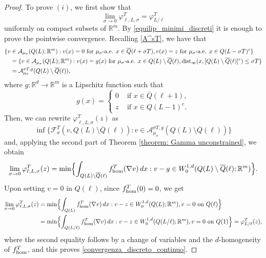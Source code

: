 \documentclass{article}
\theoremstyle{plain}
\theoremstyle{definition}
\def\rr{{\mathbb R}}
\def\ms{\mu_\sigma}
\newcommand{\f}{\varphi}
\newcommand{\s}{\sigma}
\newcommand{\A}{\mathcal{A}}
\newcommand{\F}{\mathcal{F}}
\newcommand{\Q}
{\overline{Q}}
\numberwithin{equation}{section}
\begin{document}
\begin{proof}
To prove $(i)$, we first show that
\begin{equation}
\label{convergenza_discreto_continuo}
    \lim_{\s\to0}\f^T_{\ell,L,\s} =\f^T_{L/\ell}
\end{equation}
uniformly on compact subsets of $\rr^m$.
By \eqref{equilip_minimi_discreti} it is enough to prove the pointwise convergence. Recalling \eqref{A^sT}, we have that
    \begin{equation*}
        \begin{split}
            \{ v&\in \A_{{\mu_\sigma}}(Q(L); \rr^m):  v(x)= 0 \text{ for } \ms\text{-a.e. } x\in\overline{Q}(\ell+\sigma T),
     v(x)= z \text{ for } \ms\text{-a.e. } x\in Q(L-\sigma T)^c \}\\
     &=\{ v\in \A_{\mu_\s}(Q(L); \rr^m) : v(x)=g(x) \text{ for } \ms\text{-a.e. } x\in Q(L)\setminus \Q(\ell), \text{\rm dist}_\infty(x,[Q(L)\setminus \Q(\ell)]^c)\leq \s T\} \\
     & = \A_{\ms}^{\s T,g}(Q(L)\setminus \Q(\ell)),
        \end{split}
    \end{equation*}
    where $g: \rr^d\to \rr^m$ is a Lipschitz function such that
    \begin{equation*}
 g(x)=
        \begin{cases}
            0 &\text{ if } x \in \overline{Q}(\ell+1), \\
            z &\text{ if } x\in Q(L-1)^c.
        \end{cases}
    \end{equation*}    
    Then, we can rewrite $\f^T_{\ell,L,\sigma}(z)$ as
\begin{equation*}
        \inf\{ \F^T_{\sigma}(v, Q(L)\setminus \overline{Q}(\ell)) : v\in \A_{\ms}^{\s T,g}(Q(L)\setminus \Q(\ell))\}
\end{equation*}
and, applying the second part of Theorem \ref{theorem: Gamma unconstrained}, we obtain
\begin{equation*}
    \lim_{\s\to0}\f^T_{\ell,L,\sigma}(z)  = \min\Bigl\{ \int_{Q(L)\setminus\Q(\ell)}f^T_{\rm hom}(\nabla v)\, dx : v-g\in W^{1,d}_0(Q(L)\setminus\Q(\ell);\mathbb{R}^m)\Bigr\}.
\end{equation*}
Upon setting $v=0$ in $Q(\ell)$, since $f^T_{\rm hom}(0)=0$, we get
\begin{align*}
     \lim_{\s\to0}\f^T_{\ell,L,\sigma}(z) 
     & = \min\Bigl\{ \int_{Q(L)}f^T_{\rm hom}(\nabla v)\, dx : v-z\in W^{1,d}_0(Q(L);\mathbb{R}^m), v= 0 \text{ on } Q(\ell)\Bigr\} \\
     & =\min\Bigl\{ \int_{Q(L/\ell)}f^T_{\rm hom}(\nabla v)\, dx : v-z\in W^{1,d}_0(Q(L/\ell);\mathbb{R}^m), v= 0 \text{ on } Q(1)\Bigr\}=\f^T_{L/\ell}(z),
\end{align*}
where the second equality follows by a change of variables and the $d$-homogeneity of $f^T_{\rm hom}$, and this proves \eqref{convergenza_discreto_continuo}.


\end{proof}
\end{document}

